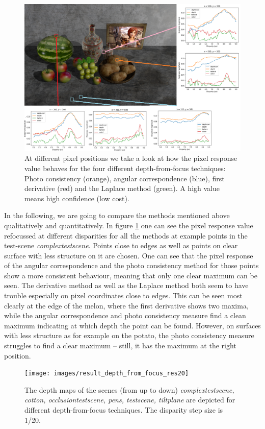 \documentclass  [
  paper    = a4,
  BCOR     = 10mm,
  twoside,
  fontsize = 12pt,
  fleqn,
  toc      = bibnumbered,
  toc      = listofnumbered,
  numbers  = noendperiod,
  headings = normal,
  listof   = leveldown,
  version  = 3.03
]                                       {scrreprt}
\begin{document}
\begin{figure}[h!]
	\centering
	\includegraphics[width=1\linewidth]{images/original_marked}
	\caption[Pixel response for depth from focus techniques]{At different pixel positions we take a look at how the pixel response value behaves for the four different depth-from-focus techniques: Photo consistency (orange), angular correspondence (blue), first derivative (red) and the Laplace method (green). A high value means high confidence (low cost).}
	\label{fig:originalmarked}
\end{figure}
	In the following, we are going to compare the methods mentioned above qualitatively and quantitatively. In figure \ref{fig:originalmarked} one can see the pixel response value refocussed at different disparities for all the methods at example points in the test-scene \textit{complextestscene}. Points close to edges as well as points on clear surface with less structure on it are chosen. One can see that the pixel response of the angular correspondence and the photo consistency method for those points show a more consistent behaviour, meaning that only one clear maximum can be seen. The derivative method as well as the Laplace method both seem to have trouble especially on pixel coordinates close to edges. This can be seen most clearly at the edge of the melon, where the first derivative shows two maxima, while the angular correspondence and photo consistency measure find a clean maximum indicating at which depth the point can be found. However, on surfaces with less structure as for example on the potato, the photo consistency measure struggles to find a clear maximum -- still, it has the maximum at the right position.
	\begin{figure}[h!]
		\centering
		\texttt{[image: images/result\_depth\_from\_focus\_res20]}
		\caption[Depth from focus: Depth maps]{The depth maps of the scenes (from up to down) \textit{complextestscene, cotton, occlusiontestscene, pens, testscene, tiltplane} are depicted for different depth-from-focus techniques. The disparity step size is 1/20.}
		\label{fig:resultdepthfromfocus}
	\end{figure} 
\end{document}
